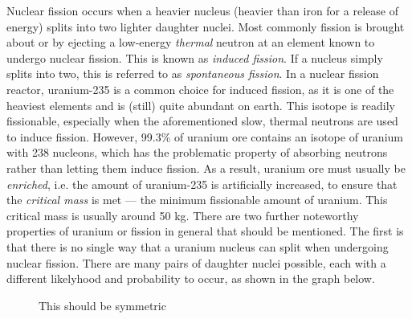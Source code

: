 
Nuclear fission occurs when a heavier nucleus (heavier than iron for a release of energy) splits into two lighter daughter nuclei. Most commonly fission is brought about or by ejecting a low-energy \emph{thermal} neutron at an element known to undergo nuclear fission. This is known as \emph{induced fission}. If a nucleus simply splits into two, this is referred to as \emph{spontaneous fission}. In a nuclear fission reactor, uranium-235 is a common choice for induced fission, as it is one of the heaviest elements and is (still) quite abundant on earth. This isotope is readily fissionable, especially when the aforementioned slow, thermal neutrons are used to induce fission. However, 99.3\% of uranium ore contains an isotope of uranium with 238 nucleons, which has the problematic property of absorbing neutrons rather than letting them induce fission. As a result, uranium ore must usually be \emph{enriched}, i.e. the amount of uranium-235 is artificially increased, to ensure that the \emph{critical mass} is met --- the minimum fissionable amount of uranium. This critical mass is usually around 50 kg. There are two further noteworthy properties of uranium or fission in general that should be mentioned. The first is that there is no single way that a uranium nucleus can split when undergoing nuclear fission. There are many pairs of daughter nuclei possible, each with a different likelyhood and probability to occur, as shown in the graph below.

\begin{figure}[h!]
	\centering
	\caption*{This should be symmetric}
\end{figure}

